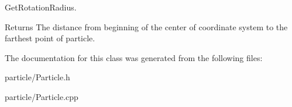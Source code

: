Get\+Rotation\+Radius. 

\begin{DoxyReturn}{Returns}
The distance from beginning of the center of coordinate system to the farthest point of particle. 
\end{DoxyReturn}


The documentation for this class was generated from the following files\+:\begin{DoxyCompactItemize}
\item 
particle/Particle.\+h\item 
particle/Particle.\+cpp\end{DoxyCompactItemize}
